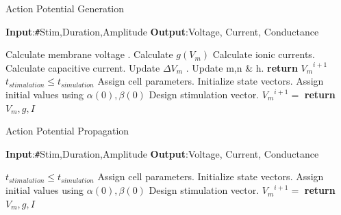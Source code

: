\documentclass{IEEEtran}
\begin{document}
\begin{algorithm}
    \caption{Action Potential Generation}\label{alg:apgen}
    \hspace*{\algorithmicindent}\textbf{Input}:\texttt{\#}Stim,Duration,Amplitude\newline
    \hspace*{\algorithmicindent}\textbf{Output}:Voltage, Current, Conductance
    \begin{algorithmic}[1]
     \label{proc:hhiterate}
        \State Calculate membrane voltage . 
        \State Calculate $g(V_m)$ 
        \State Calculate ionic currents. 
        \State Calculate capacitive current. 
        \State Update $\Delta V_m$ .
        \State Update m,n \& h. 
        \State \textbf{return} ${V_m}^{i+1}$
    \EndProcedure \\
    
    \Ensure $t_{stimulation} \le t_{simulation}$
    \State Assign cell parameters. 
    \State Initialize state vectors. 
    \State Assign initial values using $\alpha(0),\beta(0)$ 
    \State Design stimulation vector. 
        \State ${V_m}^{i+1} =$ 
    \EndFor
    \State \textbf{return} $V_m, g, I$
    \end{algorithmic}
\end{algorithm}


\begin{algorithm}
    \caption{Action Potential Propagation}\label{alg:approp}
    \hspace*{\algorithmicindent}\textbf{Input}:\texttt{\#}Stim,Duration,Amplitude\newline
    \hspace*{\algorithmicindent}\textbf{Output}:Voltage, Current, Conductance
    \begin{algorithmic}[1]
    
    \Ensure $t_{stimulation} \le t_{simulation}$
    \State Assign cell parameters. 
    \State Initialize state vectors. 
    \State Assign initial values using $\alpha(0),\beta(0)$ 
    \State Design stimulation vector. 
        \State ${V_m}^{i+1} =$ 
    \EndFor
    \State \textbf{return} $V_m, g, I$
    \end{algorithmic}
\end{algorithm}


\clearpage
\printbibliography{}
\end{document}
